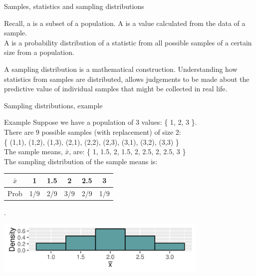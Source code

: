 \documentclass[xcolor=table, handout]{beamer}
\begin{document}
\begin{frame}{Samples, statistics and sampling distributions}
\begin{block}{}
\large Recall, a  is a subset of a population. A  is a value calculated from the data of a sample.\\
\medskip
A  is a probability distribution of a statistic from all possible samples of a certain size from a population.
\end{block}

\pause
\begin{block}{}
\large
A sampling distribution is a mathematical construction. Understanding how statistics from samples are distributed, allows judgements to be made about the predictive value of individual samples that might be collected in real life.
\end{block}
\end{frame}

\begin{frame}{Sampling distributions, example}
\begin{exampleblock}{Example}
\large
Suppose we have a population of 3 values: \{ 1, 2, 3 \}.  \\
\pause\medskip
There are 9 possible samples (with replacement) of size 2:\\
\{ (1,1), (1,2), (1,3), (2,1), (2,2), (2,3), (3,1), (3,2), (3,3) \}\\
\pause\medskip
The sample means, $\bar x$, are:
\{ 1, 1.5, 2, 1.5, 2, 2.5, 2, 2.5, 3 \}\\
\pause\medskip
The sampling distribution of the sample means is:\\
\smallskip
{\centering
\begin{tabular}{c | c  c  c  c  c}
$\bar x$ & 1 & 1.5 & 2 & 2.5 & 3\\
\hline
Prob & 1/9 & 2/9 & 3/9 & 2/9 & 1/9
\end{tabular}
\par}
\end{exampleblock}.
\\
{\centering
\includegraphics[width=4in]{../images/ch6_samp_dist}
\par}

\end{frame}
\end{document}
